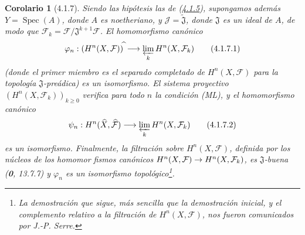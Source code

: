 \documentclass[10pt,oneside,openany]{book}
\theoremstyle{egaenv}\newtheorem*{env}{---}
\theoremstyle{egastatement}
\newtheorem*{corollary}{Corolario}
\theoremstyle{egadescription}
\newcommand{\oldpage}[2][]{\marginnote{\normalfont\scriptsize\textbf{#1}\,|\,#2}\ignorespaces}
\renewcommand{\geq}{\geqslant}
\renewcommand{\to}{\mathchoice{\longrightarrow}{\rightarrow}{\rightarrow}{\rightarrow}}
\begin{document}
\begin{corollary}[4.1.7]
\label{III.4.1.7-fr}
Siendo las hipótesis las de \textup{(\hyperref[III.4.1.5-fr]{4.1.5})}, supongamos
además $Y=\operatorname{Spec}(A)$, donde $A$ es noetheriano, y
$\mathcal J=\widetilde{\mathfrak J}$, donde $\mathfrak J$ es un ideal de
$A$, de modo que
$\mathcal F_k=\mathcal F/\mathfrak J^{k+1}\mathcal F$.
El homomorfismo canónico
\[
\varphi_n:(H^n(X,\mathcal F))^{\widehat{\,}}
\longrightarrow\varprojlim_kH^n(X,\mathcal F_k)
\tag{4.1.7.1}\label{III.4.1.7.1-fr}
\]
(donde el primer miembro es el separado completado de $H^n(X,\mathcal F)$ para
la topología $\mathfrak J$-preádica) es un isomorfismo. El sistema
proyectivo $(H^n(X,\mathcal F_k))_{k\geq0}$ verifica para todo $n$ la
condición \textup{(ML)}, y el homomorfismo canónico
\[
\psi_n:H^n(\widehat X,\widehat{\mathcal F})
\longrightarrow\varprojlim_kH^n(X,\mathcal F_k)
\tag{4.1.7.2}\label{III.4.1.7.2-fr}
\]
es un isomorfismo. Finalmente, la filtración sobre $H^n(X,\mathcal F)$, definida
por los núcleos de los homomor%
\oldpage[III]{126}
fismos canónicos
$H^n(X,\mathcal F)\to H^n(X,\mathcal F_k)$, es $\mathfrak J$-buena
\textup{(\textbf{0}, 13.7.7)} y $\varphi_n$ es un isomorfismo topológico\footnote{La demostración que sigue, más sencilla que la demostración
inicial, y el complemento relativo a la filtración de
$H^n(X,\mathcal F)$, nos fueron comunicados por J.-P. Serre.}.
\end{corollary}
\end{document}

